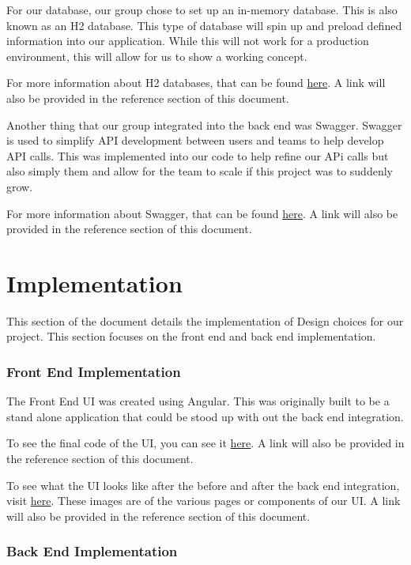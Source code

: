 \documentclass{article}
\begin{document}
	For our database, our group chose to set up an in-memory database. This is also known as an H2 database. This type of database will spin up and preload defined information into our application. While this will not work for a production environment, this will allow for us to show a working concept.
	
	For more information about H2 databases, that can be found \href{https://www.h2database.com/html/main.html}{here}. A link will also be provided in the reference section of this document.
	
	Another thing that our group integrated into the back end was Swagger. Swagger is used to simplify API development between users and teams to help develop API calls. This was implemented into our code to help refine our APi calls but also simply them and allow for the team to scale if this project was to suddenly grow.
	
	For more information about Swagger, that can be found \href{https://swagger.io/}{here}. A link will also be provided in the reference section of this document.
	
	\section{Implementation}
	
	This section of the document details the implementation of Design choices for our project. This section focuses on the front end and back end implementation.
	
	\subsubsection{Front End Implementation}
	
	The Front End UI was created using Angular. This was originally built to be a stand alone application that could be stood up with out the back end integration.
	
	To see the final code of the UI, you can see it \href{https://github.com/willissa2121/library_checkout_proj_3/tree/main/project-ui}{here}. A link will also be provided in the reference section of this document.
	
	To see what the UI looks like after the before and after the back end integration, visit \href{https://tinyurl.com/2s3zp6rx}{here}. These images are of the various pages or components of our UI. A link will also be provided in the reference section of this document.
	
	\subsubsection{Back End Implementation}
	
\end{document}

